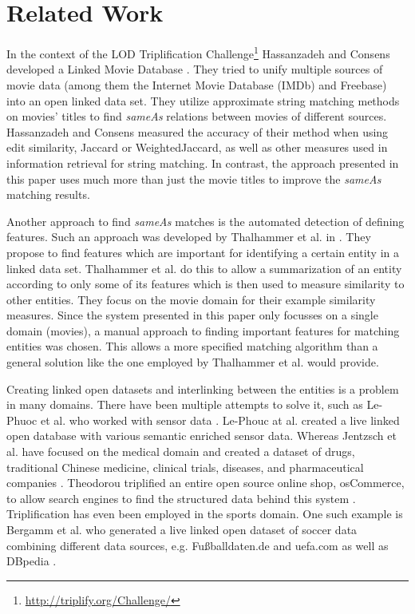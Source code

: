 \section{Related Work}
\label{sec_related_work}

In the context of the LOD Triplification Challenge\footnote{\url{http://triplify.org/Challenge/}} Hassanzadeh and Consens developed a Linked Movie Database \cite{LMDB}.
They tried to unify multiple sources of movie data (among them the Internet Movie Database (IMDb) and Freebase) into an open linked data set.
They utilize approximate string matching methods on movies' titles to find \textit{sameAs} relations between movies of different sources.
Hassanzadeh and Consens measured the accuracy of their method when using edit similarity, Jaccard or WeightedJaccard, as well as other measures used in information retrieval for string matching.
In contrast, the approach presented in this paper uses much more than just the movie titles to improve the \textit{sameAs} matching results.

Another approach to find \textit{sameAs} matches is the automated detection of defining features.
Such an approach was developed by Thalhammer et al. in \cite{MovieSummarization}.
They propose to find features which are important for identifying a certain entity in a linked data set.
Thalhammer et al. do this to allow a summarization of an entity according to only some of its features which is then used to measure similarity to other entities.
They focus on the movie domain for their example similarity measures.
Since the system presented in this paper only focusses on a single domain (movies), a manual approach to finding important features for matching entities was chosen.
This allows a more specified matching algorithm than a general solution like the one employed by Thalhammer et al. would provide.

Creating linked open datasets and interlinking between the entities is a problem in many domains.
There have been multiple attempts to solve it, such as Le-Phuoc et al. who worked with sensor data \cite{SensorData}.
Le-Phouc at al. created a live linked open database with various semantic enriched sensor data.
Whereas Jentzsch et al. have focused on the medical domain and created a dataset of drugs, traditional Chinese medicine, clinical trials, diseases, and pharmaceutical companies \cite{openDrugData}.
Theodorou triplified an entire open source online shop, osCommerce, to allow search engines to find the structured data behind this system \cite{osCommerce}.
Triplification has even been employed in the sports domain.
One such example is Bergamm et al. who generated a live linked open dataset of soccer data combining different data sources, e.g. Fußballdaten.de and uefa.com as well as DBpedia \cite{smm}.


